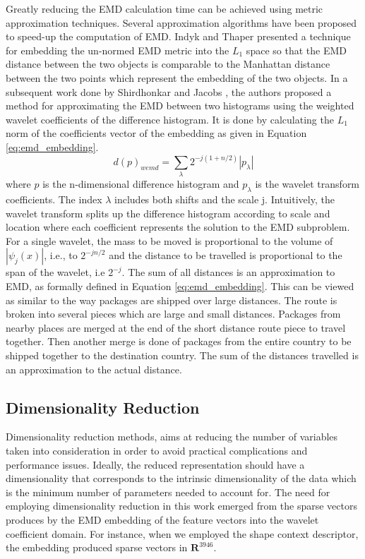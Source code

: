 \documentclass[10pt, conference, compsocconf]{IEEEtran}
\begin{document}
Greatly reducing the EMD calculation time can be achieved using metric approximation techniques.  
Several approximation algorithms have been proposed to speed-up the computation of EMD. 
Indyk and Thaper \cite{indyk2003fast} presented a technique for embedding the un-normed EMD metric into the $L_1$ space so that the EMD distance between the two objects is comparable to the Manhattan distance between the two points which represent the embedding of the two objects.
In a subsequent work done by Shirdhonkar and Jacobs \cite{shirdhonkar2008approximate}, the authors proposed a method for approximating the EMD between two histograms using the weighted wavelet coefficients of the difference histogram. 
It is done by calculating the $L_1$ norm of the coefficients vector of the embedding as given in Equation \ref{eq:emd_embedding}.
\begin{equation}
d(p)_{wemd}= \sum\limits_{\lambda} 2^{-j(1+n/2)}|p_{\lambda}|
\label{eq:emd_embedding}
\end{equation}
where $p$ is the n-dimensional difference histogram and $p_{\lambda}$ is the wavelet transform coefficients. 
The index $\lambda$ includes both shifts and the scale j.
Intuitively, the wavelet transform splits up the difference histogram according to scale and location where each coefficient represents the solution to the EMD subproblem. 
For a single wavelet, the mass to be moved is proportional to the volume of $|\psi_j(x)|$, i.e., to $2^{-jn/2}$ and the distance to be travelled is proportional to the span of the wavelet, i.e $2^{-j}$. The sum of all distances is an approximation to EMD, as formally defined in Equation \ref{eq:emd_embedding}. 
This can be viewed as similar to the way packages are shipped over large distances. 
The route is broken into several pieces which are large and small distances. 
Packages from nearby places are merged at the end of the short distance route piece to travel together. 
Then another merge is done of packages from the entire country to be shipped together to the destination country. 
The sum of the distances travelled is an approximation to the actual distance.

\subsection{Dimensionality Reduction}
\label{subsec:dimensionality_reduction}
Dimensionality reduction methods, aims at reducing the number of variables taken into consideration in order to avoid practical complications and performance issues. 
Ideally, the reduced representation should have a dimensionality that corresponds to the intrinsic dimensionality of the data \cite{van2009dimensionality} which is the minimum number of parameters needed to account for.
The need for employing dimensionality reduction in this work emerged from the sparse vectors produces by the EMD embedding of the feature vectors into the wavelet coefficient domain.
For instance, when we employed the shape context descriptor, the embedding produced sparse vectors in $\mathbf{R}^{3946}$. 
\end{document}
